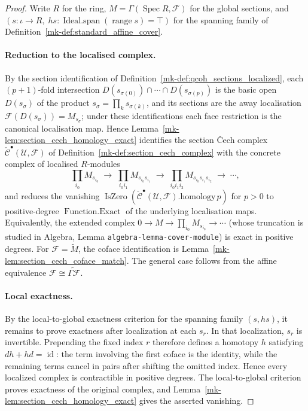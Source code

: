 \begin{proof}
  Write \(R\) for the ring, \(M = \Gamma(\operatorname{Spec} R, \mathcal{F})\) for the
  global sections, and \((s : \iota \to R,\; hs : \operatorname{Ideal.span}
  (\operatorname{range} s) = \top)\) for the spanning family of
  Definition~\ref{mk-def:standard_affine_cover}.

  \paragraph{Reduction to the localised complex.}
  By the section identification of Definition~\ref{mk-def:qcoh_sections_localized}, each
  \((p+1)\)-fold intersection \(D(s_{\sigma(0)}) \cap \cdots \cap D(s_{\sigma(p)})\)
  is the basic open \(D(s_\sigma)\) of the product
  \(s_\sigma = \prod_{k} s_{\sigma(k)}\), and its sections are the away localisation
  \(\mathcal{F}(D(s_\sigma)) = M_{s_\sigma}\); under these identifications each face
  restriction is the canonical localisation map. Hence
  Lemma~\ref{mk-lem:section_cech_homology_exact} identifies the section {\v C}ech complex
  \(\check{\mathcal{C}}^\bullet(\mathcal{U}, \mathcal{F})\) of
  Definition~\ref{mk-def:section_cech_complex} with the concrete complex of localised
  \(R\)-modules
  \[
    \prod_{i_0} M_{s_{i_0}} \;\to\;
    \prod_{i_0 i_1} M_{s_{i_0} s_{i_1}} \;\to\;
    \prod_{i_0 i_1 i_2} M_{s_{i_0} s_{i_1} s_{i_2}} \;\to\; \cdots,
  \]
  and reduces the vanishing
  \(\operatorname{IsZero}(\check{\mathcal{C}}^\bullet(\mathcal{U},
  \mathcal{F}).\mathrm{homology}\, p)\) for \(p > 0\) to positive-degree
  \(\operatorname{Function.Exact}\) of the underlying localisation maps. Equivalently,
  the extended complex \(0 \to M \to \prod_{i_0} M_{s_{i_0}} \to \cdots\) (whose
  truncation is studied in Algebra, Lemma \texttt{algebra-lemma-cover-module}) is
  exact in positive degrees. For \(\mathcal{F}=\widetilde M\), the coface
  identification is Lemma~\ref{mk-lem:section_cech_coface_match}. The general case follows
  from the affine equivalence
  \(\mathcal{F}\cong\widetilde{\Gamma\mathcal{F}}\).

  \paragraph{Local exactness.}
  By the local-to-global exactness criterion for the spanning family \((s,hs)\), it
  remains to prove exactness after localization at each \(s_r\). In that localization,
  \(s_r\) is invertible. Prepending the fixed index \(r\) therefore defines a homotopy
  \(h\) satisfying \(dh+hd=\operatorname{id}\): the term involving the first coface is
  the identity, while the remaining terms cancel in pairs after shifting the omitted
  index. Hence every localized complex is contractible in positive degrees. The
  local-to-global criterion proves exactness of the original complex, and
  Lemma~\ref{mk-lem:section_cech_homology_exact} gives the asserted vanishing.
\end{proof}

